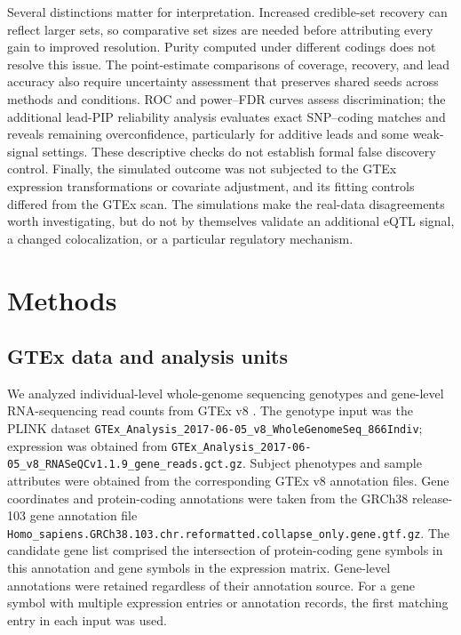 \documentclass[12pt]{article}
\begin{document}
Several distinctions matter for interpretation. Increased credible-set
recovery can reflect larger sets, so comparative set sizes are needed
before attributing every gain to improved resolution. Purity computed
under different codings does not resolve this issue.
The point-estimate comparisons of coverage, recovery, and lead
accuracy also require uncertainty assessment that preserves shared
seeds across methods and conditions. ROC and power--FDR curves assess
discrimination; the additional lead-PIP reliability analysis evaluates
exact SNP--coding matches and reveals remaining overconfidence,
particularly for additive leads and some weak-signal settings. These
descriptive checks do not establish formal false discovery control.
Finally, the simulated outcome was not
subjected to the GTEx expression transformations or covariate adjustment,
and its fitting controls differed from the GTEx scan. The simulations
make the real-data disagreements worth investigating, but do not by
themselves validate an additional eQTL signal, a changed colocalization,
or a particular regulatory mechanism.

\newpage

\section{Methods}


\subsection{GTEx data and analysis units}
We analyzed individual-level whole-genome sequencing genotypes and gene-level
RNA-sequencing read counts from GTEx v8 \cite{gtex_consortium_gtex_2020}.
The genotype input was the PLINK dataset
\texttt{GTEx\_Analysis\_2017-06-05\_v8\_WholeGenomeSeq\_866Indiv};
expression was obtained from
\texttt{GTEx\_Analysis\_2017-06-05\_v8\_RNASeQCv1.1.9\_gene\_reads.gct.gz}.
Subject phenotypes and sample attributes were obtained from the corresponding
GTEx v8 annotation files. Gene coordinates and protein-coding annotations
were taken from the GRCh38 release-103 gene annotation file
\texttt{Homo\_sapiens.GRCh38.103.chr.reformatted.collapse\_only.gene.gtf.gz}.
The candidate gene list comprised the intersection of protein-coding gene
symbols in this annotation and gene symbols in the expression matrix.
Gene-level annotations were retained regardless of their annotation source.
For a gene symbol with multiple expression entries or annotation records,
the first matching entry in each input was used.
\end{document}
